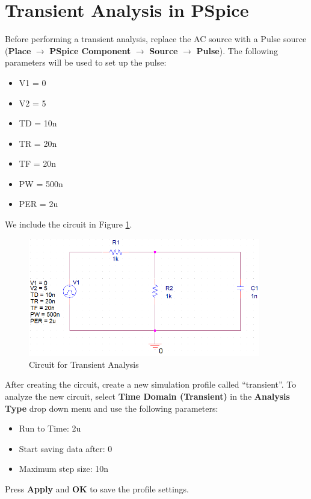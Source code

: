 \documentclass[12pt]{../manual}
\begin{document}
\section{Transient Analysis in PSpice}
Before performing a transient analysis, replace the AC source with a Pulse source (\textbf{Place} $\to$ \textbf{PSpice Component} $\to$ \textbf{Source} $\to$ \textbf{Pulse}). The following parameters will be used to set up the pulse: 
\begin{itemize}
\item V1 = 0
\item V2 = 5 
\item TD = 10n 
\item TR = 20n 
\item TF = 20n 
\item PW = 500n 
\item PER = 2u
\end{itemize}

We include the circuit in Figure \ref{fig:trans}.

\begin{figure}[ht!]
	\begin{center}
		\includegraphics[width=0.9\textwidth]{figures/TransientAnalysisCircuitCrop.PNG}
	\end{center}
	\caption{Circuit for Transient Analysis}
	\label{fig:trans}
\end{figure}

After creating the circuit, create a new simulation profile called ``transient''. To analyze the new circuit, select \textbf{Time Domain (Transient)} in the \textbf{Analysis Type} drop down menu and use the following parameters:
\begin{itemize}
\item Run to Time: 2u
\item Start saving data after: 0
\item Maximum step size: 10n
\end{itemize}
Press \textbf{Apply} and \textbf{OK} to save the profile settings. 
\end{document}

